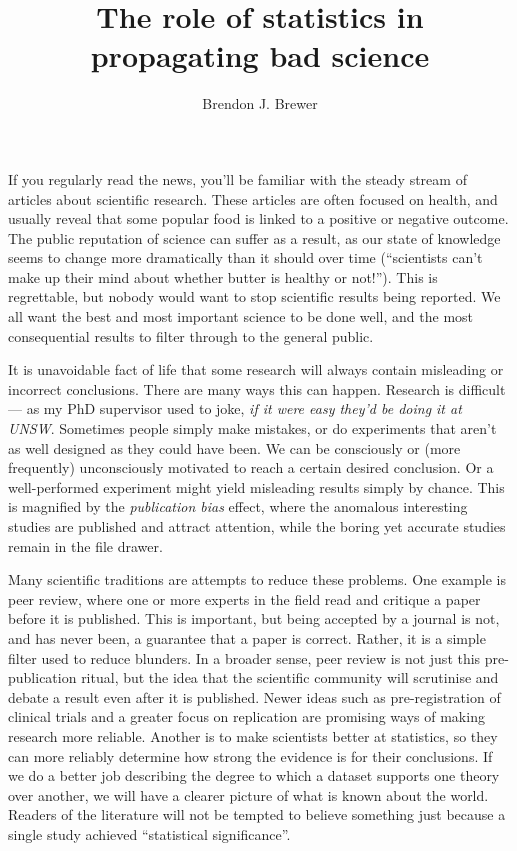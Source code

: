 \documentclass[a4paper, 12pt]{article}
\title{The role of statistics in propagating bad science}
\author{Brendon J. Brewer}
\begin{document}
\sffamily
\maketitle

If you regularly read the news, you'll be familiar with the steady stream of
articles about scientific research. These articles are often focused on
health, and usually reveal that some
popular food
is linked to a positive or negative outcome.
The public reputation of science can suffer as
a result, as our state of knowledge seems to change more dramatically
than it should
over time (``scientists can't make up their mind about whether butter is
healthy or not!''). This is regrettable,
but nobody would want to stop scientific results being reported. We all want
the best and most important science to be done well, and the most
consequential results to filter through to the general public.

It is unavoidable fact of life that some research will always
contain misleading or incorrect conclusions.
There are many ways this can happen. Research is difficult --- as my
PhD supervisor used to joke, {\em if it were easy they'd be doing it at UNSW}.
Sometimes
people simply make mistakes, or do experiments that aren't as well designed as
they could have been.
We can be consciously or (more frequently)
unconsciously motivated to reach a certain desired conclusion.
Or a well-performed experiment might yield
misleading results simply by chance. This is magnified by the
{\em publication bias} effect, where the anomalous interesting studies
are published and attract attention, while the boring yet accurate studies
remain in the file drawer.

Many scientific traditions are attempts to reduce these
problems. One example is peer review, where one or more experts in the field
read and critique a paper before it is published.
This is important, but being accepted by a journal
is not, and has never been, a guarantee that a paper is correct. Rather, it
is a simple filter used to reduce blunders.
In a broader sense, peer review is not just this pre-publication ritual, but
the idea that the scientific community will scrutinise and debate a result
even after it is published.
Newer ideas such as pre-registration of clinical trials and
a greater focus on replication are promising ways of making research more
reliable. Another is to make scientists better at statistics, so they can more reliably determine how strong the
evidence is for their conclusions. If we do a better job describing
the degree to which a dataset supports one theory over
another, we will have a clearer picture of what is known about the
world. Readers of the literature will not be tempted to believe something
just because a single study achieved ``statistical significance''.
\end{document}
